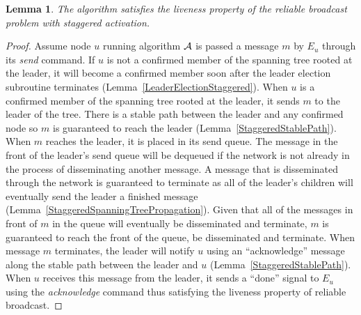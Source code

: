 \documentclass[english]{article}
\newtheorem{lemma}[theorem]{Lemma}
\begin{document}
\begin{lemma}
\label{StaggeredRBLiveness}
The algorithm satisfies the liveness property of the reliable broadcast problem with staggered activation.
\end{lemma}
\begin{proof}

Assume node $u$ running algorithm $\cal A$ is passed a message $m$ by $E_u$ through its \textit{send} command. If $u$ is not a confirmed member of the spanning tree rooted at the leader, it will become a confirmed member soon after the leader election subroutine terminates (Lemma~\ref{LeaderElectionStaggered}). When $u$ is a confirmed member of the spanning tree rooted at the leader, it sends $m$ to the leader of the tree. There is a stable path between the leader and any confirmed node so $m$ is guaranteed to reach the leader (Lemma~\ref{StaggeredStablePath}). When $m$ reaches the leader, it is placed in its send queue. The message in the front of the leader's send queue will be dequeued if the network is not already in the process of disseminating another message. A message that is disseminated through the network is guaranteed to terminate as all of the leader's children will eventually send the leader a finished message (Lemma~\ref{StaggeredSpanningTreePropagation}). Given that all of the messages in front of $m$ in the queue will eventually be disseminated and terminate, $m$ is guaranteed to reach the front of the queue, be disseminated and terminate. When message $m$ terminates, the leader will notify $u$ using an ``acknowledge'' message along the stable path between the leader and $u$ (Lemma~\ref{StaggeredStablePath}). When $u$ receives this message from the leader, it sends  a ``done'' signal to $E_u$ using the \textit{acknowledge} command thus satisfying the liveness property of reliable broadcast.


\end{proof}
\end{document}
